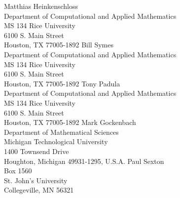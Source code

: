 \documentclass[pdf,ps2pdf,11pt]{SANDreport}
\begin{document}
\begin{SANDdistribution}
 Matthias Heinkenschloss \\ Department of Computational and Applied Mathematics\\MS 134 Rice University\\
6100 S. Main Street\\Houston, TX 77005-1892
 Bill Symes\\Department of Computational and Applied Mathematics\\MS 134 Rice University\\
6100 S. Main Street\\Houston, TX 77005-1892
 Tony Padula\\Department of Computational and Applied Mathematics\\MS 134 Rice University\\
6100 S. Main Street\\Houston, TX 77005-1892
 Mark Gockenbach \\ Department of Mathematical Sciences\\Michigan Technological University\\ 
1400 Townsend Drive\\Houghton, Michigan 49931-1295, U.S.A.
 Paul Sexton \\ Box 1560 \\ St. John's University \\ Collegeville, MN 56321

\end{SANDdistribution}
\end{document}
